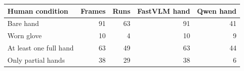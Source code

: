 \begin{tabularx}{\linewidth}{Xrrrr}
\toprule
Human condition & Frames & Runs & FastVLM hand & Qwen hand\\
\midrule
Bare hand & 91 & 63 & 91 & 41\\
Worn glove & 10 & 4 & 10 & 9\\
At least one full hand & 63 & 49 & 63 & 44\\
Only partial hands & 38 & 29 & 38 & 6\\
\bottomrule
\end{tabularx}
